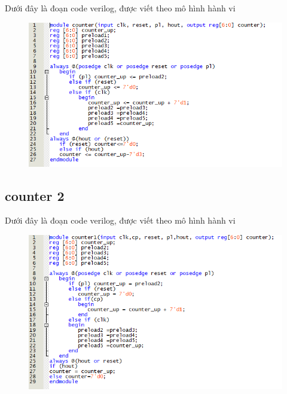 \documentclass[a4paper]{article}
\begin{document}
	Dưới đây là đoạn code verilog, được viết theo mô hình hành vi
	
	\begin{center}
	\begin{figure}[H]
		\begin{center}
			\includegraphics[scale=.8] {c.png}
		\end{center}
	\end{figure}
	\end{center}	
	
	\subsection{counter 2}
	
	Dưới đây là đoạn code verilog, được viết theo mô hình hành vi
	
	\begin{center}
	\begin{figure}[H]
		\begin{center}
			\includegraphics[scale=.83] {c1.png}
		\end{center}
	\end{figure}
	\end{center}	
	
\end{document}
